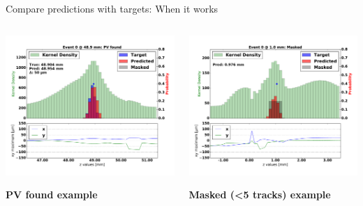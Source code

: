 \begin{frame}{Compare predictions with targets: When it works}
  \begin{columns}[c]
        \begin{center}
           \includegraphics[width=1\textwidth, trim=60 40 60 20]{images/07Jan19_AltCNN4Layer_D35_sp_02.pdf}

           \textbf{\color{lhcbBlue}\large PV found example}
       \end{center}
       \begin{center}
           \includegraphics[width=1\textwidth, trim=60 40 60 20]{images/07Jan19_AltCNN4Layer_D35_sp_01.pdf}

           \textbf{\color{lhcbBlue}\large Masked (<5 tracks) example}
       \end{center}
  \end{columns}
\end{frame}


